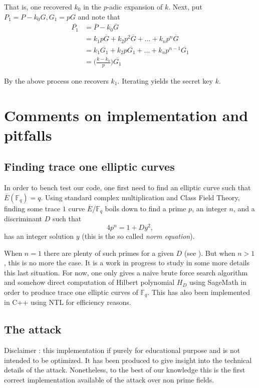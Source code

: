 \documentclass[10pt]{article}
\theoremstyle{definition}
\newcommand{\F}{\mathbb{F}}
\begin{document}
\noindent That is, one recovered $k_0$ in the $p$-adic expansion of $k$.	
Next, put $P_1 = P - k_0G, G_1 = pG$ and note that
\begin{align*}
\overline{P_1} &=  \overline{P} - k_0 \overline{G}  \\
               &=  k_1p\overline{G} + k_2p^2\overline{G} + \dots + k_np^n \overline{G}\\
               &=  k_1\overline{G_1} + k_2p\overline{G_1} + \dots + k_np^{n-1} \overline{G_1}\\
               &= \Big(\frac{k-k_0}{p}\Big)\overline{G_1}
\end{align*}

\noindent By the above process one recovers $k_1$.
Iterating yields the secret key $k$.


\section{Comments on implementation and pitfalls}


\subsection{Finding trace one elliptic curves}


In order to bench test our code, one first need to find an elliptic curve such that $\overline{E}(\F_q) = q$.
Using standard complex multiplication and Class Field Theory, finding some trace $1$ curve $\overline{E} /\F_q$ boils down to find a prime $p$, an integer $n$, and a discriminant $D$ such that 
\[ 4p^n = 1 + Dy^2, \]
has an integer solution $y$ (this is the so called \textsl{norm equation}).

When $n =1$ there are plenty of such primes for a given $D$ (see \cite{LEPREVOST2005225}).
But when $n > 1$, this is no more the case. 
It is a work in progress to study in some more details this last situation.
For now, one only gives a naive brute force search algorithm and somehow direct computation of Hilbert polynomial $H_D$ using SageMath in order to produce trace one elliptic curves of $\F_q$.
This has also been implemented in C++ using NTL for efficiency reasons.
\subsection{The attack}

Disclaimer : this implementation if purely for educational purpose and is not intended to be optimized. 
It has been produced  to give insight into the technical details of the attack.
Nonetheless, to the best of our knowledge this is the first correct implementation available of the attack over non prime fields.
\end{document}
